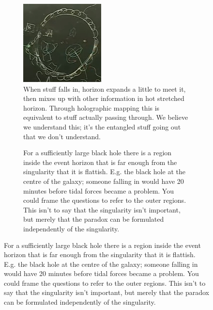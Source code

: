 \documentclass[]{article}
\begin{document}
{\begin{appendices}
	
	\begin{figure}[H]
		\begin{center}
			\caption{	Questions.}
			\begin{subfigure}[t]{0.45\textwidth}
				\caption{When stuff falls in, horizon expands  a little to meet it, then mixes up with other information in hot stretched horizon. Through holographic mapping this is equivalent to stuff actually passing through. We believe we understand this; it's the entangled stuff going out that we don't understand.}\label{fig:ibh-horizon-falling-in}
				\includegraphics[width=\textwidth]{ibh-horizon-falling-in}
			\end{subfigure}
			\;
			\begin{subfigure}[t]{0.45\textwidth}
				\caption{For a sufficiently large black hole there is a region inside the event horizon that is far enough from the singularity that it is flattish. E.g. the black hole at the centre of the galaxy; someone falling in would have 20 minutes before tidal forces became a problem. You could frame the questions to refer to the outer regions. This isn't to say that the singularity isn't important, but merely that the paradox can be formulated independently of the singularity. }\label{fig:ibh-horizon-inside-large}

\end{subfigure}
\end{center}
\end{figure}
\end{appendices}}
\end{document}

